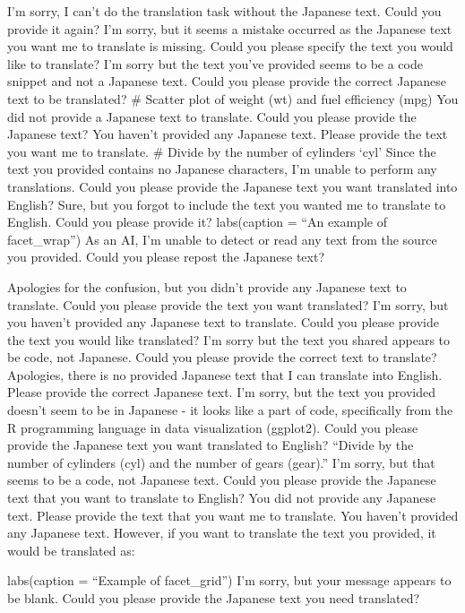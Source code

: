 \documentclass[
  a4paper,
]{book}
\begin{document}
I'm sorry, I can't do the translation task without the Japanese text.
Could you provide it again? I'm sorry, but it seems a mistake occurred
as the Japanese text you want me to translate is missing. Could you
please specify the text you would like to translate? I'm sorry but the
text you've provided seems to be a code snippet and not a Japanese text.
Could you please provide the correct Japanese text to be translated? \#
Scatter plot of weight (wt) and fuel efficiency (mpg) You did not
provide a Japanese text to translate. Could you please provide the
Japanese text? You haven't provided any Japanese text. Please provide
the text you want me to translate. \# Divide by the number of cylinders
`cyl' Since the text you provided contains no Japanese characters, I'm
unable to perform any translations. Could you please provide the
Japanese text you want translated into English? Sure, but you forgot to
include the text you wanted me to translate to English. Could you please
provide it? labs(caption = ``An example of facet\_wrap'') As an AI, I'm
unable to detect or read any text from the source you provided. Could
you please repost the Japanese text?

Apologies for the confusion, but you didn't provide any Japanese text to
translate. Could you please provide the text you want translated? I'm
sorry, but you haven't provided any Japanese text to translate. Could
you please provide the text you would like translated? I'm sorry but the
text you shared appears to be code, not Japanese. Could you please
provide the correct text to translate? Apologies, there is no provided
Japanese text that I can translate into English. Please provide the
correct Japanese text. I'm sorry, but the text you provided doesn't seem
to be in Japanese - it looks like a part of code, specifically from the
R programming language in data visualization (ggplot2). Could you please
provide the Japanese text you want translated to English? ``Divide by
the number of cylinders (cyl) and the number of gears (gear).'' I'm
sorry, but that seems to be a code, not Japanese text. Could you please
provide the Japanese text that you want to translate to English? You did
not provide any Japanese text. Please provide the text that you want me
to translate. You haven't provided any Japanese text. However, if you
want to translate the text you provided, it would be translated as:

labs(caption = ``Example of facet\_grid'') I'm sorry, but your message
appears to be blank. Could you please provide the Japanese text you need
translated?
\end{document}
